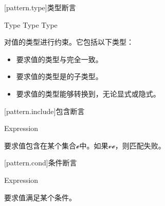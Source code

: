 [pattern.type]{类型断言}

\begin{bnf}
 \br
     Type \br
    \terminal{:} Type \br
     Type
\end{bnf}

\pnum
{}对值的类型进行约束。它包括以下类型：

\begin{itemize}
    \item {}要求值的类型与完全一致。
    \item {}要求值的类型是的子类型。
    \item {}要求值的类型能够转换到，无论显式或隐式。
    \end{itemize}

[pattern.include]{包含断言}

\begin{bnf}
 \br
     Expression
\end{bnf}

\pnum
{}要求值包含在某个集合$\mathcal{e}$中。如果$\mathcal{v}$$\mathcal{e}$，则匹配失败。

[pattern.cond]{条件断言}

\begin{bnf}
 \br
     Expression
\end{bnf}

\pnum
{}要求值满足某个条件。